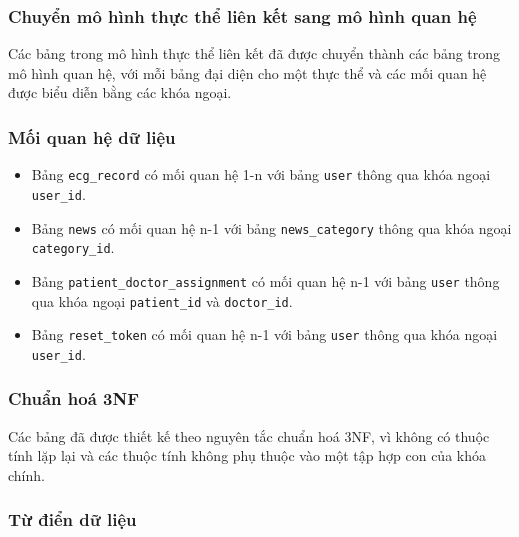 \subsubsection{Chuyển mô hình thực thể liên kết sang mô hình quan hệ}
Các bảng trong mô hình thực thể liên kết đã được chuyển thành các bảng trong mô hình quan hệ, với mỗi bảng đại diện cho một thực thể và các mối quan hệ được biểu diễn bằng các khóa ngoại.

\subsubsection{Mối quan hệ dữ liệu}

\begin{itemize}
  \item Bảng \texttt{ecg\_record} có mối quan hệ 1-n với bảng \texttt{user} thông qua khóa ngoại \texttt{user\_id}.
  \item Bảng \texttt{news} có mối quan hệ n-1 với bảng \texttt{news\_category} thông qua khóa ngoại \texttt{category\_id}.
  \item Bảng \texttt{patient\_doctor\_assignment} có mối quan hệ n-1 với bảng \texttt{user} thông qua khóa ngoại \texttt{patient\_id} và \texttt{doctor\_id}.
  \item Bảng \texttt{reset\_token} có mối quan hệ n-1 với bảng \texttt{user} thông qua khóa ngoại \texttt{user\_id}.
\end{itemize}

\subsubsection{Chuẩn hoá 3NF}
Các bảng đã được thiết kế theo nguyên tắc chuẩn hoá 3NF, vì không có thuộc tính lặp lại và các thuộc tính không phụ thuộc vào một tập hợp con của khóa chính.
\subsubsection{Từ điển dữ liệu}



